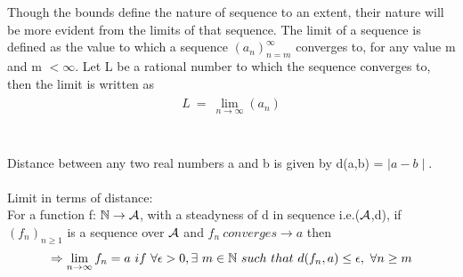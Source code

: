 \documentclass[a4paper]{article}
\begin{document}
Though the bounds define the nature of sequence to an extent, their nature will be more evident from the limits of that sequence. The limit of a sequence is defined as the value to which a sequence $(a_n)^{\infty}_{n=m}$  converges to, for any value m and m $< \infty$. Let L be a rational number to which the sequence converges to, then the limit is written as\\
\begin{align}
\begin{split}
L \ = \ \lim_{n \to \infty} (a_n)
\end{split}
\end{align}
\\
\\
Distance between any two real numbers a and b is given by d(a,b) = $\mid a-b \mid$.\\
\\
Limit in terms of distance:
\\
For a function f: $\mathbb N \to \mathcal A$, with a steadyness of d in sequence i.e.($\mathcal A$,d), if $(f_n)_{n\geq1}$ is a sequence over $\mathcal A$ and $f_n \ converges \to a$ then\\
\begin{align}
\begin{split}
\Rightarrow \lim_{n \to \infty} f_n = a\ if\ \forall \epsilon > 0, \exists\ m\in \mathbb N\ such\ that\ d(f_n, a) \leq \epsilon,\ \forall n\geq m
\end{split}
\end{align}
\end{document}
